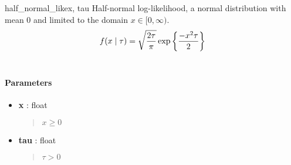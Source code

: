 \hypertarget{pymc.distributions.half_normal_like}{}\begin{funcdesc}{half\_normal\_like}{x, tau}
Half-normal log-likelihood, a normal distribution with mean 0 and limited
to the domain $x \in [0, \infty)$.
\begin{gather}
\begin{split}f(x \mid \tau) = \sqrt{\frac{2\tau}{\pi}}\exp\left\{ {\frac{-x^2 \tau}{2}}\right\}\end{split}\notag\\\begin{split}\end{split}\notag
\end{gather}
\paragraph{Parameters}
\begin{itemize}
\item[] \textbf{x} : float
\begin{quote}

$x \ge 0$
\end{quote}

\item[] \textbf{tau} : float
\begin{quote}

$\tau > 0$
\end{quote}
\end{itemize}
\end{funcdesc}

